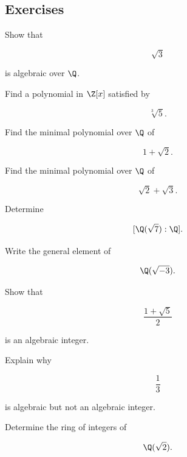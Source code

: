 \subsection{Exercises}
\label{subsec:algebraic-number-theory-exercises}

\begin{exercise}[1]
Show that

\[ \sqrt3 \]

is algebraic over \(\Q\).
\end{exercise}

\begin{exercise}[1]
Find a polynomial in \(\Z[x]\) satisfied by

\[ \sqrt[3]{5}. \]
\end{exercise}

\begin{exercise}[2]
Find the minimal polynomial over \(\Q\) of

\[ 1+\sqrt2. \]
\end{exercise}

\begin{exercise}[2]
Find the minimal polynomial over \(\Q\) of

\[ \sqrt2+\sqrt3. \]
\end{exercise}

\begin{exercise}[1]
Determine

\[ [\Q(\sqrt7):\Q]. \]
\end{exercise}

\begin{exercise}[2]
Write the general element of

\[ \Q(\sqrt{-3}). \]
\end{exercise}

\begin{exercise}[2]
Show that

\[ \frac{1+\sqrt5}{2} \]

is an algebraic integer.
\end{exercise}

\begin{exercise}[2]
Explain why

\[ \frac13 \]

is algebraic but not an algebraic integer.
\end{exercise}

\begin{exercise}[1]
Determine the ring of integers of

\[ \Q(\sqrt2). \]
\end{exercise}

